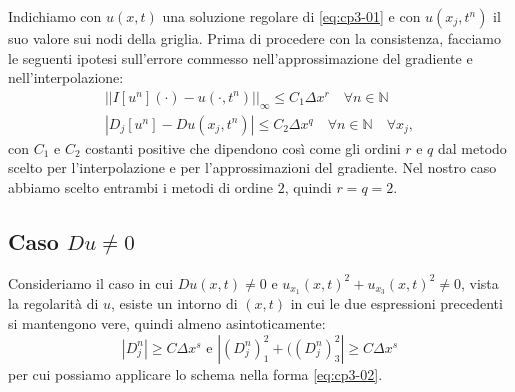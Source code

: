 Indichiamo con $u(x,t)$ una soluzione regolare di \eqref{eq:cp3-01} e con $u(x_j,t^n)$ il suo valore sui nodi della griglia.
Prima di procedere con la consistenza, facciamo le seguenti ipotesi sull'errore commesso nell'approssimazione del gradiente e nell'interpolazione:
\begin{gather}
\label{eq:cp3-04}
||I[u^n](\cdot)-u(\cdot,t^n)||_{\infty}\le C_1\Delta x^r\quad\forall n\in\mathbb{N} \\
\label{eq:cp3-05}
|D_j[u^n]-Du(x_j,t^n)|\le C_2\Delta x^q\quad\forall n\in\mathbb{N}\quad\forall x_j, 
\end{gather}
con $C_1$ e $C_2$ costanti positive che dipendono così come gli ordini $r$ e $q$ dal metodo scelto per l'interpolazione e per l'approssimazioni del gradiente. Nel nostro caso abbiamo scelto entrambi i metodi di ordine $2$, quindi $r=q=2$.

%
\subsection{Caso $Du \ne 0$}

Consideriamo il caso in cui $Du(x,t)\ne 0$ e $u_{x_1}(x,t)^2+u_{x_3}(x,t)^2\ne 0$, vista la regolarità di $u$, esiste un intorno di $(x,t)$ in cui le due espressioni precedenti si mantengono vere, quindi almeno asintoticamente:
\[
|D_j^n|\ge C\Delta x^s\text{ e }|(D_j^n)_1^2+((D_j^n)_3^2|\ge C\Delta x^s
\]
per cui possiamo applicare lo schema nella forma \eqref{eq:cp3-02}.

